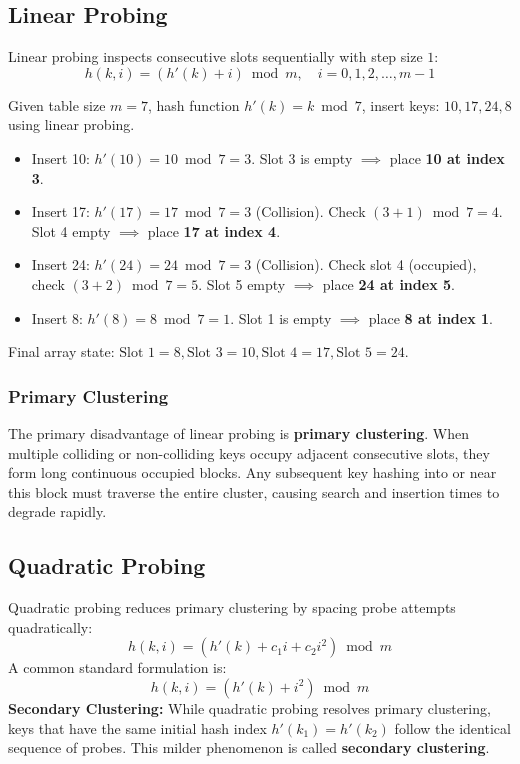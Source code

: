 \subsection{Linear Probing}
Linear probing inspects consecutive slots sequentially with step size $1$:
\[
\boxed{h(k, i) = (h'(k) + i) \bmod m, \quad i = 0, 1, 2, \dots, m-1}
\]

\begin{tcolorbox}[title=\textbf{Worked Example: Linear Probing}]
Given table size $m = 7$, hash function $h'(k) = k \bmod 7$, insert keys: $10, 17, 24, 8$ using linear probing.
\begin{itemize}
    \item Insert 10: $h'(10) = 10 \bmod 7 = 3$. Slot 3 is empty $\implies$ place \textbf{10 at index 3}.
    \item Insert 17: $h'(17) = 17 \bmod 7 = 3$ (Collision). Check $(3+1)\bmod 7 = 4$. Slot 4 empty $\implies$ place \textbf{17 at index 4}.
    \item Insert 24: $h'(24) = 24 \bmod 7 = 3$ (Collision). Check slot 4 (occupied), check $(3+2)\bmod 7 = 5$. Slot 5 empty $\implies$ place \textbf{24 at index 5}.
    \item Insert 8: $h'(8) = 8 \bmod 7 = 1$. Slot 1 is empty $\implies$ place \textbf{8 at index 1}.
\end{itemize}
Final array state: $\text{Slot 1} = 8, \text{Slot 3} = 10, \text{Slot 4} = 17, \text{Slot 5} = 24$.
\end{tcolorbox}

\subsubsection*{Primary Clustering}
The primary disadvantage of linear probing is \textbf{primary clustering}. When multiple colliding or non-colliding keys occupy adjacent consecutive slots, they form long continuous occupied blocks. Any subsequent key hashing into or near this block must traverse the entire cluster, causing search and insertion times to degrade rapidly.

\subsection{Quadratic Probing}
Quadratic probing reduces primary clustering by spacing probe attempts quadratically:
\[
\boxed{h(k, i) = (h'(k) + c_1 i + c_2 i^2) \bmod m}
\]
A common standard formulation is:
\[
h(k, i) = (h'(k) + i^2) \bmod m
\]
\textbf{Secondary Clustering:} While quadratic probing resolves primary clustering, keys that have the same initial hash index $h'(k_1) = h'(k_2)$ follow the identical sequence of probes. This milder phenomenon is called \textbf{secondary clustering}.

